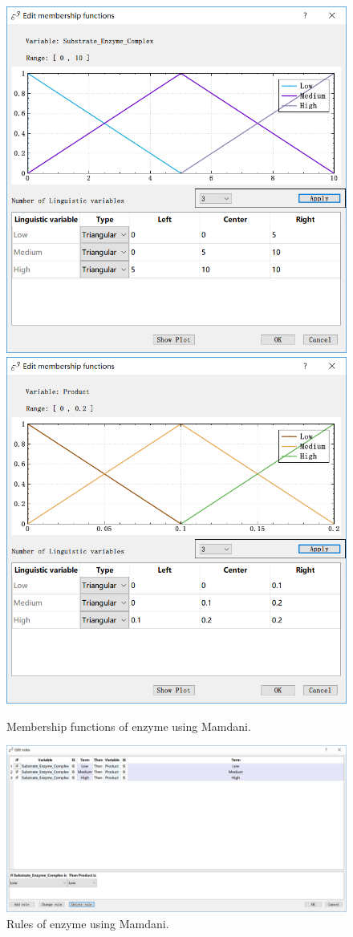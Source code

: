 \documentclass[journal,a4paper,onecolumn]{article}
\begin{document}
\begin{figure}[!hbt]
	\begin{center}
		\includegraphics[width=0.45\columnwidth]{fig41}
		\includegraphics[width=0.45\columnwidth]{fig42}
		\caption{Membership functions of enzyme using Mamdani.}
		\label{fig:Membership functions of enzyme using Mamdani.}
	\end{center}
\end{figure}
\begin{figure}[!hbt]
	\begin{center}
		\includegraphics[width=\columnwidth]{fig43}
		\caption{Rules of enzyme using Mamdani.}
		\label{fig:Rules of enzyme using Mamdani.}
	\end{center}
\end{figure}
\end{document}
